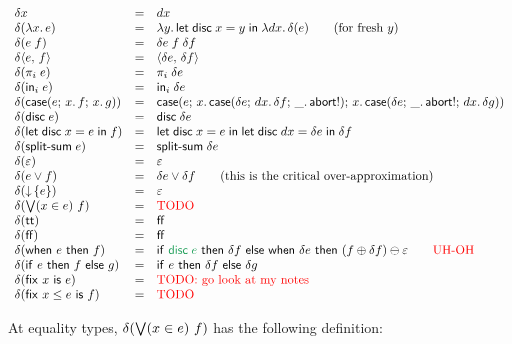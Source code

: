 \documentclass{article}
\begin{document}
\[
\begin{array}{lcll}
  \delta x &=& dx\\
  \delta(\fn\bind{x} e) &=& \fn\bind{y} \letdisc{x}{y} {\fn\bind{dx} \delta(e)}
  \qquad\text{(for fresh $y$)}\\
  \delta(e\;f) &=& \delta e \; f \; \delta f\\
  \delta \pair{e}{f} &=& \pair{\delta{e}}{\delta{f}}\\
  \delta(\pi_i\; e) &=& \pi_i\; \delta{e}\\
  \delta(\inj{i}{e}) &=& \inj{i}{\delta{e}}\\
  \delta(\case{e}{x}{f}{x}{g})
  &=& \case{e}
        {x}{\case{\delta e}{dx}{\delta f}{\_}{\ms{abort!}}}
        {x}{\case{\delta e}{\_}{\ms{abort!}}{dx}{\delta g}}\\
  \delta(\disc e) &=& \disc{\delta e}\\
  \delta(\letdisc{x}{e}{f}) &=&
  \letdisc{x}{e}{
    \letdisc{dx}{\delta e}{\delta f}}\\
  \delta(\splitsum{e}) &=&
  \splitsum{\delta e}\\
  \delta(\unit) &=& \unit\\
  \delta(e \vee f) &=& \delta e \vee \delta f
  \qquad \text{(this is the critical over-approximation)}\\
  \delta(\downintro{e}) &=& \unit\\
  \delta(\downelim{x}{e}{f}) &=& \text{\TODO}\\
  \delta(\ett) &=& \eff\\
  \delta(\eff) &=& \eff\\
  \delta(\when{e}{f})
  &=& \ifthen{\color{ForestGreen} \disc{e}}{\delta f}{
    \when{\delta e}{(f \oplus \delta f) \ominus \unit}}
  \qquad \text{\color{red} UH-OH}\\
  \delta(\ifthen{e}{f}{g}) &=& \ifthen{e}{\delta f}{\delta g}\\
  \delta(\fix{x}{e}) &=& \text{\todo{TODO: go look at my notes}}\\
  \delta(\fixle{x}{e}{f}) &=& \text{\TODO}
\end{array}
\]

At equality types, $\delta(\textstyle\bigvee({x \in e})\  f)$ has the following definition:
\end{document}
